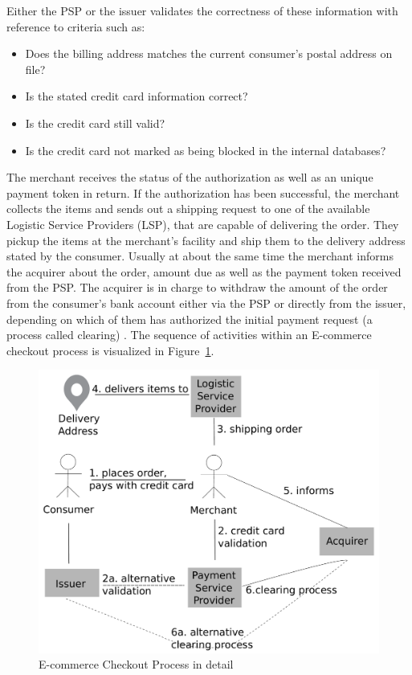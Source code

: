 Either the \gls{PSP} or the issuer validates the correctness of these information with reference to criteria such as: \@

\begin{itemize}
    \item Does the billing address matches the current consumer's postal address on file?
    \item Is the stated credit card information correct?
    \item Is the credit card still valid?
    \item Is the credit card not marked as being blocked in the internal databases?
\end{itemize}

The merchant receives the status of the authorization as well as an unique payment token in return. If the authorization has been successful, the merchant collects the items and sends out a shipping request to one of the available Logistic Service Providers (\gls{LSP}), that are capable of delivering the order. They pickup the items at the merchant's facility and ship them to the delivery address stated by the consumer. Usually at about the same time the merchant informs the acquirer about the order, amount due as well as the payment token received from the \gls{PSP}. The acquirer is in charge to withdraw the amount of the order from the consumer's bank account either via the \gls{PSP} or directly from the issuer, depending on which of them has authorized the initial payment request (a process called clearing) \citep{VisaPayment2014}. The sequence of activities within an \gls{E-commerce} checkout process is visualized in Figure~\ref{fig:images_ecommerce_checkout_process}.\@

\begin{figure}[!ht]
	\centering
		\includegraphics[width=0.9\columnwidth]{images/e-commerce-checkout-process.pdf}
	\caption{\gls{E-commerce} Checkout Process in detail}
\label{fig:images_ecommerce_checkout_process}
\end{figure}


